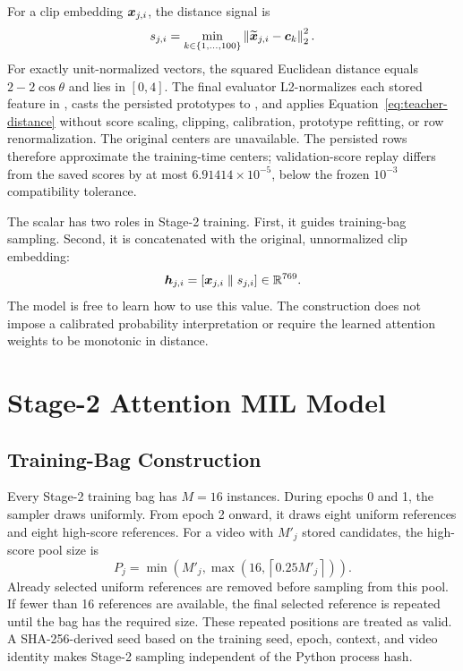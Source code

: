 For a clip embedding $\boldsymbol{x}_{j,i}$, the distance signal is
\begin{equation}
    s_{j,i}
    =\min_{k\in\{1,\ldots,100\}}
      \left\lVert\widetilde{\boldsymbol{x}}_{j,i}-\boldsymbol{c}_k\right\rVert_2^2.
    \label{eq:teacher-distance}
\end{equation}
For exactly unit-normalized vectors, the squared Euclidean distance equals $2-2\cos\theta$ and lies in $[0,4]$. The final evaluator L2-normalizes each stored feature in , casts the persisted prototypes to , and applies Equation~\ref{eq:teacher-distance} without score scaling, clipping, calibration, prototype refitting, or row renormalization. The original  centers are unavailable. The persisted  rows therefore approximate the training-time centers; validation-score replay differs from the saved scores by at most $6.91414\times10^{-5}$, below the frozen $10^{-3}$ compatibility tolerance.

The scalar has two roles in Stage-2 training. First, it guides training-bag sampling. Second, it is concatenated with the original, unnormalized clip embedding:
\begin{equation}
    \boldsymbol{h}_{j,i}
    =[\boldsymbol{x}_{j,i}\parallel s_{j,i}]
    \in\mathbb{R}^{769}.
    \label{eq:augmented-instance}
\end{equation}
The model is free to learn how to use this value. The construction does not impose a calibrated probability interpretation or require the learned attention weights to be monotonic in distance.

\section{Stage-2 Attention MIL Model}
\label{sec:stage2-model}

\subsection{Training-Bag Construction}

Every Stage-2 training bag has $M=16$ instances. During epochs 0 and 1, the sampler draws uniformly. From epoch 2 onward, it draws eight uniform references and eight high-score references. For a video with $M'_j$ stored candidates, the high-score pool size is
\begin{equation}
    P_j=\min\!\left(M'_j,\max\!\left(16,\left\lceil0.25M'_j\right\rceil\right)\right).
\end{equation}
Already selected uniform references are removed before sampling from this pool. If fewer than 16 references are available, the final selected reference is repeated until the bag has the required size. These repeated positions are treated as valid. A SHA-256-derived seed based on the training seed, epoch, context, and video identity makes Stage-2 sampling independent of the Python process hash.

